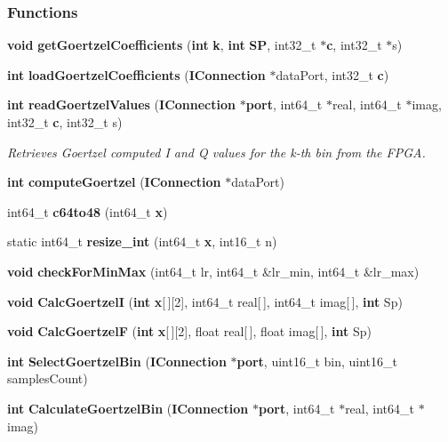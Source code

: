 \subsubsection*{Functions}
\begin{DoxyCompactItemize}
\item 
{\bf void} {\bf get\+Goertzel\+Coefficients} ({\bf int} {\bf k}, {\bf int} {\bf SP}, int32\+\_\+t $\ast${\bf c}, int32\+\_\+t $\ast$s)
\item 
{\bf int} {\bf load\+Goertzel\+Coefficients} ({\bf I\+Connection} $\ast$data\+Port, int32\+\_\+t {\bf c})
\item 
{\bf int} {\bf read\+Goertzel\+Values} ({\bf I\+Connection} $\ast${\bf port}, int64\+\_\+t $\ast$real, int64\+\_\+t $\ast$imag, int32\+\_\+t {\bf c}, int32\+\_\+t s)
\begin{DoxyCompactList}\small\item\em Retrieves Goertzel computed I and Q values for the k-\/th bin from the F\+P\+GA. \end{DoxyCompactList}\item 
{\bf int} {\bf compute\+Goertzel} ({\bf I\+Connection} $\ast$data\+Port)
\item 
int64\+\_\+t {\bf c64to48} (int64\+\_\+t {\bf x})
\item 
static int64\+\_\+t {\bf resize\+\_\+int} (int64\+\_\+t {\bf x}, int16\+\_\+t n)
\item 
{\bf void} {\bf check\+For\+Min\+Max} (int64\+\_\+t lr, int64\+\_\+t \&lr\+\_\+min, int64\+\_\+t \&lr\+\_\+max)
\item 
{\bf void} {\bf Calc\+GoertzelI} ({\bf int} {\bf x}[$\,$][2], int64\+\_\+t real[$\,$], int64\+\_\+t imag[$\,$], {\bf int} Sp)
\item 
{\bf void} {\bf Calc\+GoertzelF} ({\bf int} {\bf x}[$\,$][2], float real[$\,$], float imag[$\,$], {\bf int} Sp)
\item 
{\bf int} {\bf Select\+Goertzel\+Bin} ({\bf I\+Connection} $\ast${\bf port}, uint16\+\_\+t bin, uint16\+\_\+t samples\+Count)
\item 
{\bf int} {\bf Calculate\+Goertzel\+Bin} ({\bf I\+Connection} $\ast${\bf port}, int64\+\_\+t $\ast$real, int64\+\_\+t $\ast$imag)
\end{DoxyCompactItemize}
